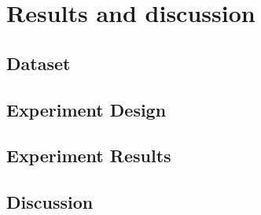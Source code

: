 \chapter{Results and discussion}
    \label{chap:results}

\section{Dataset}
    \label{sec:dataset}

\section{Experiment Design}

\section{Experiment Results}
    \label{sec:experiment_design}

\section{Discussion}
